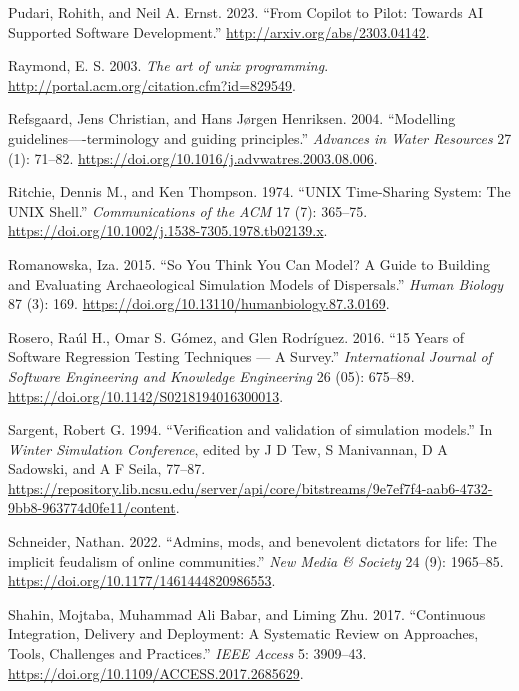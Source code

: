 \documentclass[preprint,11pt,5p]{elsarticle}
\newlength{\cslhangindent}
\newenvironment{CSLReferences}[2] %
{\begin{list}{}{%
	\setlength{\itemindent}{0pt}
	\setlength{\leftmargin}{0pt}
	\setlength{\parsep}{0pt}
	\ifodd #1
	\setlength{\leftmargin}{\cslhangindent}
	\setlength{\itemindent}{-1\cslhangindent}
	\fi
	\setlength{\itemsep}{#2\baselineskip}}}
{\end{list}}
\begin{document}
\begin{CSLReferences}{1}{0}
Pudari, Rohith, and Neil A. Ernst. 2023. {``{From Copilot to Pilot:
Towards AI Supported Software Development}.''}
\url{http://arxiv.org/abs/2303.04142}.

Raymond, E. S. 2003. \emph{{The art of unix programming}}.
\url{http://portal.acm.org/citation.cfm?id=829549}.

Refsgaard, Jens Christian, and Hans Jørgen Henriksen. 2004.
{``{Modelling guidelines----terminology and guiding principles}.''}
\emph{Advances in Water Resources} 27 (1): 71--82.
\url{https://doi.org/10.1016/j.advwatres.2003.08.006}.

Ritchie, Dennis M., and Ken Thompson. 1974. {``{UNIX Time-Sharing
System: The UNIX Shell}.''} \emph{Communications of the ACM} 17 (7):
365--75. \url{https://doi.org/10.1002/j.1538-7305.1978.tb02139.x}.

Romanowska, Iza. 2015. {``{So You Think You Can Model? A Guide to
Building and Evaluating Archaeological Simulation Models of
Dispersals}.''} \emph{Human Biology} 87 (3): 169.
\url{https://doi.org/10.13110/humanbiology.87.3.0169}.

Rosero, Raúl H., Omar S. Gómez, and Glen Rodríguez. 2016. {``{15 Years
of Software Regression Testing Techniques --- A Survey}.''}
\emph{International Journal of Software Engineering and Knowledge
Engineering} 26 (05): 675--89.
\url{https://doi.org/10.1142/S0218194016300013}.

Sargent, Robert G. 1994. {``{Verification and validation of simulation
models}.''} In \emph{Winter Simulation Conference}, edited by J D Tew, S
Manivannan, D A Sadowski, and A F Seila, 77--87.
\url{https://repository.lib.ncsu.edu/server/api/core/bitstreams/9e7ef7f4-aab6-4732-9bb8-963774d0fe11/content}.

Schneider, Nathan. 2022. {``{Admins, mods, and benevolent dictators for
life: The implicit feudalism of online communities}.''} \emph{New Media
{\&} Society} 24 (9): 1965--85.
\url{https://doi.org/10.1177/1461444820986553}.

Shahin, Mojtaba, Muhammad Ali Babar, and Liming Zhu. 2017.
{``{Continuous Integration, Delivery and Deployment: A Systematic Review
on Approaches, Tools, Challenges and Practices}.''} \emph{IEEE Access}
5: 3909--43. \url{https://doi.org/10.1109/ACCESS.2017.2685629}.


\end{CSLReferences}
\end{document}
